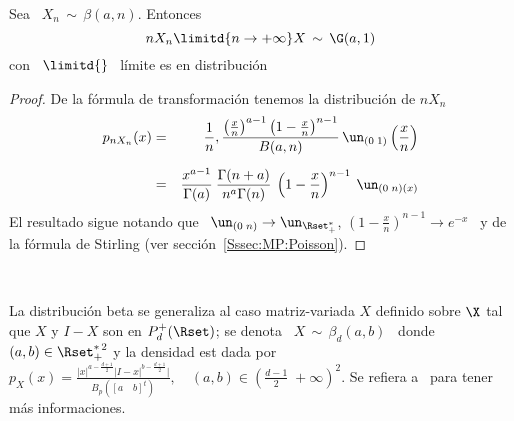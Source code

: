 \begin{lema}
\label{Lem:GamaLimiteBeta}
%
  Sea \ $X_n \, \sim \, \beta(a,n)$. Entonces
  \[
  n X_n \limitd{n \to +\infty} X \, \sim \, \G(a,1)
  \]
  con \ $\displaystyle \limitd{}$ \ l\'imite es en distribuci\'on
\end{lema}
%
\begin{proof}
  De la f\'ormula de transformaci\'on tenemos la distribuci\'on de $n X_n$
  \begin{eqnarray*}
  p_{n X_n}(x) & = & \frac{1}{n} , \frac{\left( \frac{x}{n} \right)^{a-1} \left( 1
  - \frac{x}{n} \right)^{n-1}}{B(a,n)} \, \un_{(0 \; 1)}\left( \frac{x}{n} \right)\\[2mm]
  & = & \frac{x^{a-1}}{\Gamma(a)} \: \frac{\Gamma(n+a)}{n^a \Gamma(n)} \: \left( 1 -
  \frac{x}{n} \right)^{n-1} \: \un_{(0 \; n)(x)}
  \end{eqnarray*}
  El resultado sigue  notando que \ $\un_{(0 \;  n)} \to \un_{\Rset_+^*}$, \quad
  $\left(  1 -  \frac{x}{n} \right)^{n-1}  \to e^{-x}$  \ y  de la  f\'ormula de
  Stirling (ver secci\'on~\ref{Sssec:MP:Poisson}).
\end{proof}

\

La distribuci\'on beta  se generaliza al caso matriz-variada  $X$ definido sobre
$\X$  tal que $X$  y $I-X$  son en  $P_d^+(\Rset)$; se  denota \  $X \,  \sim \,
\beta_d(a,b)$ \ donde \ $(a,b) \in \Rset_+^{*  \, 2}$ y la densidad est dada por
$\displaystyle   p_X(x)    =   \frac{|x|^{a   -    \frac{d+1}{2}}   |I-x|^{b   -
    \frac{d+1}{2}}|}{B_p\left([a  \quad  b]^t\right)},  \quad (a,b)  \in  \left(
  \frac{d-1}{2} \; +\infty \right)^2$. Se refiera a~\cite[Cap.~5]{GupNag99} para
tener m\'as informaciones.